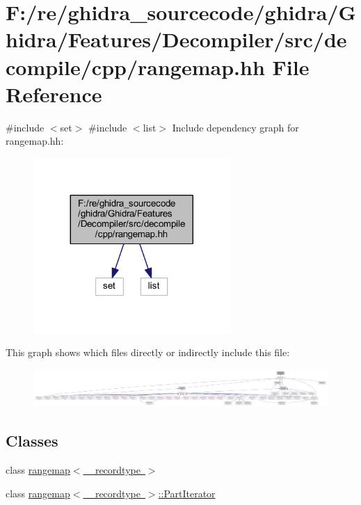\hypertarget{rangemap_8hh}{}\section{F\+:/re/ghidra\+\_\+sourcecode/ghidra/\+Ghidra/\+Features/\+Decompiler/src/decompile/cpp/rangemap.hh File Reference}
\label{rangemap_8hh}
{\ttfamily \#include $<$set$>$}\newline
{\ttfamily \#include $<$list$>$}\newline
Include dependency graph for rangemap.\+hh\+:
\nopagebreak
\begin{figure}[H]
\begin{center}
\leavevmode
\includegraphics[width=212pt]{rangemap_8hh__incl}
\end{center}
\end{figure}
This graph shows which files directly or indirectly include this file\+:
\nopagebreak
\begin{figure}[H]
\begin{center}
\leavevmode
\includegraphics[width=350pt]{rangemap_8hh__dep__incl}
\end{center}
\end{figure}
\subsection*{Classes}
\begin{DoxyCompactItemize}
\item 
class \mbox{\hyperlink{classrangemap}{rangemap$<$ \+\_\+recordtype $>$}}
\item 
class \mbox{\hyperlink{classrangemap_1_1_part_iterator}{rangemap$<$ \+\_\+recordtype $>$\+::\+Part\+Iterator}}
\end{DoxyCompactItemize}
